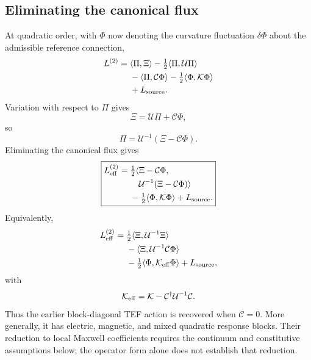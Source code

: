 \documentclass[11pt]{article}
\begin{document}
\subsection{Eliminating the canonical flux}

At quadratic order, with $\Phi$ now denoting the curvature fluctuation $\delta\Phi$ about the admissible reference connection,
\begin{equation}
\begin{aligned}
L^{(2)}={}&\langle\Pi,\Xi\rangle
-\tfrac12\langle\Pi,\mathcal U\Pi\rangle\\
&-\langle\Pi,\mathcal C\Phi\rangle
-\tfrac12\langle\Phi,\mathcal K\Phi\rangle\\
&+L_{\rm source}.
\end{aligned}
\end{equation}
Variation with respect to $\Pi$ gives
\begin{equation}
\Xi
=
\mathcal U\Pi+\mathcal C\Phi,
\end{equation}
so
\begin{equation}
\boxed{
\Pi
=
\mathcal U^{-1}(\Xi-\mathcal C\Phi).
}
\end{equation}
Eliminating the canonical flux gives
\begin{equation}
\boxed{
\begin{aligned}
L_{\rm eff}^{(2)}={}&\tfrac12\langle\Xi-\mathcal C\Phi,\\
&\quad\mathcal U^{-1}(\Xi-\mathcal C\Phi)\rangle\\
&-\tfrac12\langle\Phi,\mathcal K\Phi\rangle
+L_{\rm source}.
\end{aligned}
}
\end{equation}
Equivalently,
\begin{equation}
\begin{aligned}
L_{\rm eff}^{(2)}={}&\tfrac12\langle\Xi,\mathcal U^{-1}\Xi\rangle\\
&-\langle\Xi,\mathcal U^{-1}\mathcal C\Phi\rangle\\
&-\tfrac12\langle\Phi,\mathcal K_{\rm eff}\Phi\rangle
+L_{\rm source},
\end{aligned}
\end{equation}
with
\begin{equation}
\mathcal K_{\rm eff}
=
\mathcal K
-
\mathcal C^\dagger\mathcal U^{-1}\mathcal C.
\end{equation}
Thus the earlier block-diagonal TEF action is recovered when $\mathcal C=0$. More generally, it has electric, magnetic, and mixed quadratic response blocks. Their reduction to local Maxwell coefficients requires the continuum and constitutive assumptions below; the operator form alone does not establish that reduction.
\end{document}
